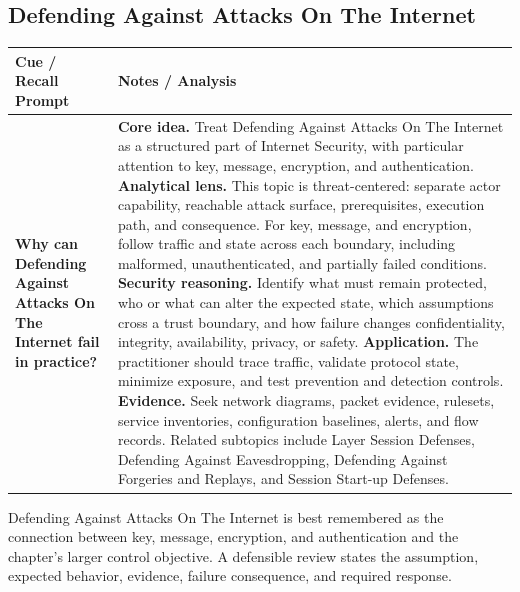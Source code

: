 \documentclass[11pt]{article}
\newcommand{\CornellHeader}{%
\rowcolor{Navy}\color{white}\bfseries Cue / Recall Prompt & \color{white}\bfseries Notes / Analysis\\\hline}
\newcommand{\CornellRow}[2]{%
\cellcolor{CueGray}\RaggedRight\textbf{#1} & \RaggedRight #2\\\hline}
\begin{document}
\subsection*{Defending Against Attacks On The Internet}
\begin{longtable}{>{\RaggedRight\arraybackslash}p{}|>{\RaggedRight\arraybackslash}p{}}
\CornellHeader
\CornellRow{Why can Defending Against Attacks On The Internet fail in practice?}{\textbf{Core idea.} Treat Defending Against Attacks On The Internet as a structured part of Internet Security, with particular attention to key, message, encryption, and authentication. \textbf{Analytical lens.} This topic is threat-centered: separate actor capability, reachable attack surface, prerequisites, execution path, and consequence. For key, message, and encryption, follow traffic and state across each boundary, including malformed, unauthenticated, and partially failed conditions. \textbf{Security reasoning.} Identify what must remain protected, who or what can alter the expected state, which assumptions cross a trust boundary, and how failure changes confidentiality, integrity, availability, privacy, or safety. \textbf{Application.} The practitioner should trace traffic, validate protocol state, minimize exposure, and test prevention and detection controls. \textbf{Evidence.} Seek network diagrams, packet evidence, rulesets, service inventories, configuration baselines, alerts, and flow records. Related subtopics include Layer Session Defenses, Defending Against Eavesdropping, Defending Against Forgeries and Replays, and Session Start-up Defenses.}
\end{longtable}
\begin{topicsummary}
Defending Against Attacks On The Internet is best remembered as the connection between key, message, encryption, and authentication and the chapter's larger control objective. A defensible review states the assumption, expected behavior, evidence, failure consequence, and required response.
\end{topicsummary}
\end{document}
